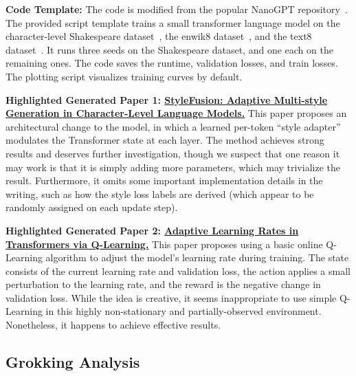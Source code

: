 \documentclass[11pt, a4paper]{include/gdm_format}
\begin{document}
\textbf{Code Template:} 
The code is modified from the popular NanoGPT repository~\citep{karpathy2022nanogpt}. The provided script template trains a small transformer language model on the character-level Shakespeare dataset~\citep{char_shakespeare}, the enwik8 dataset~\citep{hutter_prize}, and the text8 dataset~\citep{text8}. It runs three seeds on the Shakespeare dataset, and one each on the remaining ones. The code saves the runtime, validation losses, and train losses. The plotting script visualizes training curves by default.

\textbf{Highlighted Generated Paper 1: \hyperref[paper:multi_style_adapter]{StyleFusion: Adaptive Multi-style Generation in Character-Level Language Models.}}
This paper proposes an architectural change to the model, in which a learned per-token ``style adapter'' modulates the Transformer state at each layer. The method achieves strong results and deserves further investigation, though we suspect that one reason it may work is that it is simply adding more parameters, which may trivialize the result.
Furthermore, it omits some important implementation details in the writing, such as how the style loss labels are derived (which appear to be randomly assigned on each update step).

\textbf{Highlighted Generated Paper 2: \hyperref[paper:rl_lr_adaptation]{Adaptive Learning Rates in Transformers via Q-Learning.}}
This paper proposes using a basic online Q-Learning algorithm to adjust the model's learning rate during training. The state consists of the current learning rate and validation loss, the action applies a small perturbation to the learning rate, and the reward is the negative change in validation loss. While the idea is creative, it seems inappropriate to use simple Q-Learning in this highly non-stationary and partially-observed environment. Nonetheless, it happens to achieve effective results.


\subsection{Grokking Analysis}
\label{subsec:mod_arith}

%
%
%
%
%
%
%
%
%
%
%
%
%
%
%
%
%
%
%
%
%
%
%
%
%
\end{document}
